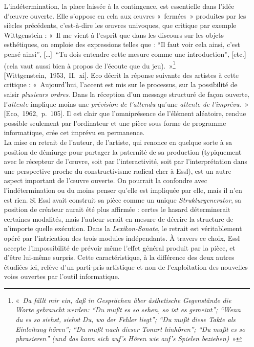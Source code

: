 \documentclass[a4paper,12pt]{article}
\newcommand{\guill}[1]{«~#1~»}
\newcommand{\guilldeux}[1]{“#1”}
\newcommand{\tpp}[0]{[\dots]}
\newcommand{\cicite}[1]{{\footnotesize[#1]}}
\begin{document}
L'indétermination, la place laissée à la contingence, est essentielle dans l'idée d'œuvre ouverte. Elle s'oppose en cela aux œuvres \guill{fermées} produites par les siècles précédents, c'est-à-dire les œuvres univoques, que critique par exemple Wittgenstein : \guill{Il me vient à l'esprit que dans les discours sur les objets esthétiques, on emploie des expressions telles que : \guilldeux{Il faut voir cela ainsi, c'est pensé ainsi}, \tpp~\guilldeux{Tu dois entendre cette mesure comme une introduction}, [etc.] (cela vaut aussi bien à propos de l'écoute que du jeu).}\footnote{\guill{\emph{Da fällt mir ein, daß in Gesprächen über ästhetische Gegenstände die Worte gebraucht werden\!: \guilldeux{Du mußt es so sehen, so ist es gemeint}\!; \guilldeux{Wenn du es so siehst, siehst Du, wo der Fehler liegt}\!; \guilldeux{Du mußt diese Takte als Einleitung hören}\!; \guilldeux{Du mußt nach dieser Tonart hinhören}\!; \guilldeux{Du mußt es so phrasieren} (und das kann sich auf's Hören wie auf's Spielen beziehen)}}} \cicite{Wittgenstein,~1953,~II,~xi}. Eco décrit la réponse suivante des artistes à cette critique : \guill{Aujourd'hui, l'accent est mis sur le processus, sur la possibilité de saisir \emph{plusieurs ordres}. Dans la réception d'un message structuré de façon ouverte, l'\emph{attente} implique moins une \emph{prévision de l'attendu} qu'une \emph{attente de l'imprévu}.} \cicite{Eco,~1962,~p.~105}. Il est clair que l'omniprésence de l'élément aléatoire, rendue possible seulement par l'ordinateur et une pièce sous forme de programme informatique, crée cet imprévu en permanence. \\
La mise en retrait de l'auteur, de l'artiste, qui renonce en quelque sorte à sa position de démiurge pour partager la paternité de sa production (typiquement avec le récepteur de l'œuvre, soit par l'interactivité, soit par l'interprétation dans une perspective proche du constructivisme radical cher à Essl), est un autre aspect important de l'œuvre ouverte. On pourrait la confondre avec l'indétermination ou du moins penser qu'elle est impliquée par elle, mais il n'en est rien. Si Essl avait construit sa pièce comme un unique \emph{Strukturgenerator}, sa position de créateur aurait été plus affirmée : certes le hasard déterminerait certaines modalités, mais l'auteur serait en mesure de décrire la structure de n'importe quelle exécution. Dans la \emph{Lexikon-Sonate}, le retrait est véritablement opéré par l'intrication des trois modules indépendants. À travers ce choix, Essl accepte l'impossibilité de prévoir même l'effet général produit par la pièce, et d'être lui-même surpris. Cette caractéristique, à la différence des deux autres étudiées ici, relève d'un parti-pris artistique et non de l'exploitation des nouvelles voies ouvertes par l'outil informatique. \\
\end{document}
